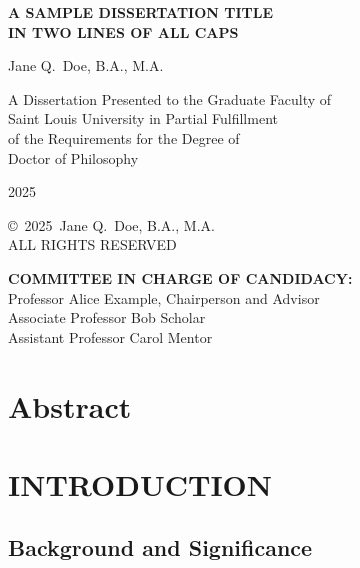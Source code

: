\documentclass[12pt,oneside]{book}
\newcommand{\thesistitle}{A SAMPLE DISSERTATION TITLE\\IN TWO LINES OF ALL CAPS}
\newcommand{\authorname}{Jane Q.\ Doe, B.A., M.A.}
\newcommand{\degree}{Doctor of Philosophy}
\newcommand{\graduationyear}{2025}
\newcommand{\committeelist}{%
Professor Alice Example, Chairperson and Advisor\\[1em]
Associate Professor Bob Scholar\\[1em]
Assistant Professor Carol Mentor}
\begin{document}
\begin{titlepage}
\begin{center}
\doublespacing
{\Large\bfseries \thesistitle\par}
\vfill
\authorname\par
\vfill
A Dissertation Presented to the Graduate Faculty of\\
Saint Louis University in Partial Fulfillment\\
of the Requirements for the Degree of\\[1em]
\degree\par
\vfill
\graduationyear
\end{center}
\end{titlepage}

\clearpage
{}
\setcounter{page}{1}
\thispagestyle{plain}
\begin{center}
\copyright\ \graduationyear\ \authorname\\
ALL RIGHTS RESERVED
\end{center}
\clearpage

\thispagestyle{plain}
\noindent\textbf{COMMITTEE IN CHARGE OF CANDIDACY:}\\[2em]
\committeelist
\clearpage

\chapter*{Abstract}
\singlespacing
\lipsum[1]  %
\doublespacing
\clearpage

\tableofcontents\clearpage
\listoftables\clearpage
\listoffigures\clearpage

\mainmatter

\chapter{INTRODUCTION}
\section{Background and Significance}
\lipsum[2-3]
\end{document}
